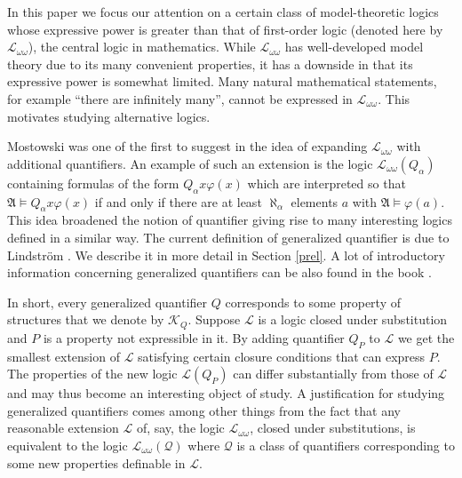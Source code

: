 \documentclass{ndjflart}
\theoremstyle{plain}
\theoremstyle{definition}
\numberwithin{equation}{section}
\begin{document}
In this paper we focus our attention on a certain class of model-theoretic
logics whose expressive power is greater than that of first-order logic
(denoted here by $\mathcal{L}_{\omega\omega}$), the central logic in
mathematics.
While $\mathcal{L}_{\omega\omega}$ has well-developed model theory due to its
many convenient properties, it has a downside in that its expressive power is
somewhat limited.
Many natural mathematical statements, for example ``there are infinitely many'',
cannot be expressed in $\mathcal{L}_{\omega\omega}$.
This motivates studying alternative logics.

Mostowski was one of the first to suggest in \cite{Mostowski:1957}
the idea of expanding $\mathcal{L}_{\omega\omega}$ with additional quantifiers.
An example of such an extension is the logic
$\mathcal{L}_{\omega\omega}(Q_{\alpha})$ containing formulas of the form
$Q_{\alpha} x \varphi(x)$ which are interpreted so that
$\mathfrak{A} \vDash  Q_{\alpha} x \varphi(x)$ if and only if there are at least
$\aleph_{\alpha}$ elements $a$ with $\mathfrak{A} \vDash \varphi(a)$.
This idea broadened the notion of quantifier giving rise to many interesting
logics defined in a similar way.
The current definition of generalized quantifier is due to Lindstr\"om
\cite{Lindstrom:1966}. We describe it in more detail in Section \ref{prel}.
A lot of introductory information concerning generalized quantifiers can be also
found in the book \cite{Ebbinghaus:1985}.

In short, every generalized quantifier $Q$ corresponds to some property of
structures that we denote by $\mathcal{K}_Q$.
Suppose $\mathcal{L}$ is a logic closed under substitution and $P$ is a property
not expressible in it. By adding quantifier $Q_P$ to $\mathcal{L}$ we get the
smallest extension of $\mathcal{L}$ satisfying certain closure conditions that
can express $P$.
The properties of the new logic $\mathcal{L}(Q_P)$ can differ substantially from
those of $\mathcal{L}$ and may thus become an interesting object of study.
A justification for studying generalized quantifiers comes among other things
from the fact that any reasonable extension $\mathcal{L}$ of, say, the logic
$\mathcal{L}_{\omega\omega}$,
closed under substitutions, is equivalent to the logic
$\mathcal{L}_{\omega\omega}(\mathcal{Q})$ where $\mathcal{Q}$ is a class of
quantifiers corresponding to some new properties definable in $\mathcal{L}$.
\end{document}

